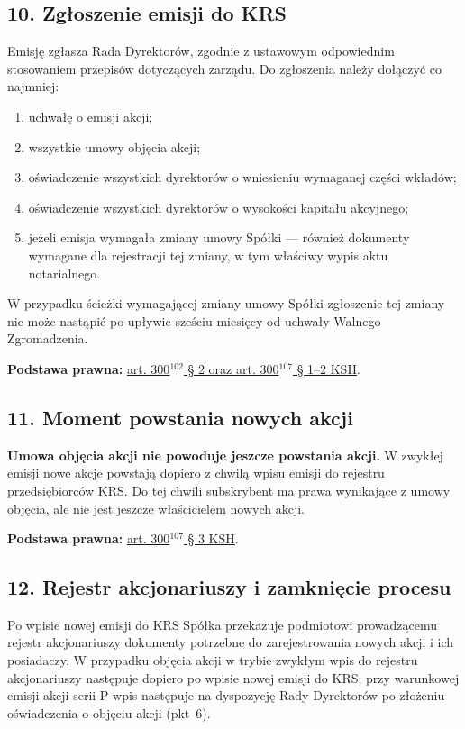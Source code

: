 \documentclass[12pt,a4paper]{report}
\begin{document}
\subsection*{10. Zgłoszenie emisji do KRS}

Emisję zgłasza Rada Dyrektorów, zgodnie z ustawowym odpowiednim stosowaniem przepisów dotyczących zarządu. Do zgłoszenia należy dołączyć co najmniej:
\begin{enumerate}
  \item uchwałę o emisji akcji;
  \item wszystkie umowy objęcia akcji;
  \item oświadczenie wszystkich dyrektorów o wniesieniu wymaganej części wkładów;
  \item oświadczenie wszystkich dyrektorów o wysokości kapitału akcyjnego;
  \item jeżeli emisja wymagała zmiany umowy Spółki --- również dokumenty wymagane dla rejestracji tej zmiany, w tym właściwy wypis aktu notarialnego.
\end{enumerate}

W przypadku ścieżki wymagającej zmiany umowy Spółki zgłoszenie tej zmiany nie może nastąpić po upływie sześciu miesięcy od uchwały Walnego Zgromadzenia.

\textbf{Podstawa prawna:} \href{https://eli.gov.pl/api/acts/DU/2024/18/text.html}{art. 300$^{102}$ § 2 oraz art. 300$^{107}$ § 1--2 KSH}.

\subsection*{11. Moment powstania nowych akcji}

\textbf{Umowa objęcia akcji nie powoduje jeszcze powstania akcji.} W zwykłej emisji nowe akcje powstają dopiero z chwilą wpisu emisji do rejestru przedsiębiorców KRS. Do tej chwili subskrybent ma prawa wynikające z umowy objęcia, ale nie jest jeszcze właścicielem nowych akcji.

\textbf{Podstawa prawna:} \href{https://eli.gov.pl/api/acts/DU/2024/18/text.html}{art. 300$^{107}$ § 3 KSH}.

\subsection*{12. Rejestr akcjonariuszy i zamknięcie procesu}

Po wpisie nowej emisji do KRS Spółka przekazuje podmiotowi prowadzącemu rejestr akcjonariuszy dokumenty potrzebne do zarejestrowania nowych akcji i ich posiadaczy. W przypadku objęcia akcji w trybie zwykłym wpis do rejestru akcjonariuszy następuje dopiero po wpisie nowej emisji do KRS; przy warunkowej emisji akcji serii P wpis następuje na dyspozycję Rady Dyrektorów po złożeniu oświadczenia o objęciu akcji (pkt~6).
\end{document}
